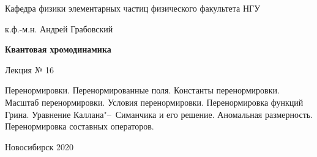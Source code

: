 \documentclass[12pt,pagesize,paper=landscape,paper=192mm:108mm]{scrbook}
\begin{document}
\begin{titlepage}
\begin{center}
    Кафедра физики элементарных частиц физического факультета НГУ
    \medskip

    \Large
    к.ф.-м.н. Андрей Грабовский
    
    \bigskip

    \huge
    \textbf{Квантовая хромодинамика}
    \bigskip

    \Large
    Лекция № 16
    \vfill

    \normalsize
    \begin{minipage}{0.7\linewidth}
      Перенормировки. Перенормированные поля. Константы
      перенормировки.  Масштаб перенормировки. Условия
      перенормировки. Перенормировка функций Грина. Уравнение
      Каллана"--~Симанчика и его решение. Аномальная
      размерность. Перенормировка составных операторов.
    \end{minipage}
    \vfill

    \normalsize \ccbysa\hspace{0.5em}  Новосибирск 2020
  \end{center}
\end{titlepage}
\end{document}
